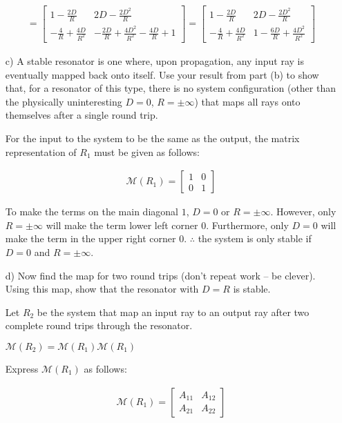 \documentclass[fleqn]{article}
\begin{document}
\begin{enumerate}[nolistsep]
			\begin{align*}
				= \begin{bmatrix}1 - \frac{2D}{R} & 2D - \frac{2D^2}{R}\\ -\frac{4}{R} +\frac{4D}{R^2} & -\frac{2D}{R} + \frac{4D^2}{R^2} -\frac{4D}{R} + 1\end{bmatrix} = \begin{bmatrix}1 - \frac{2D}{R} & 2D - \frac{2D^2}{R}\\ -\frac{4}{R} + \frac{4D}{R^2} & 1 - \frac{6D}{R} + \frac{4D^2}{R^2}\end{bmatrix}
			\end{align*}
			
			\item[c)] A stable resonator is one where, upon propagation, any input ray is eventually mapped back onto itself. Use your result from part (b) to show that, for a resonator of this type, there is no system configuration (other than the physically uninteresting $D = 0$, $R = \pm \infty$) that maps all rays onto themselves after a single round trip.
			
			\pagebreak
			For the input to the system to be the same as the output, the matrix representation of $R_1$ must be given as follows:
			
			\begin{align*}
				\mathcal{M}(R_1) = \begin{bmatrix}1 & 0\\ 0 & 1\end{bmatrix}
			\end{align*}
			
			To make the terms on the main diagonal $1$, $D = 0$ or $R = \pm\infty$. However, only $R = \pm\infty$ will make the term lower left corner $0$. Furthermore, only $D = 0$ will make the term in the upper right corner $0$. $\therefore$ the system is only stable if $D=0$ and $R=\pm\infty$.			
			
			\item[d)] Now find the map for two round trips (don’t repeat work – be clever). Using this map, show that the resonator with $D = R$ is stable.
			
			Let $R_2$ be the system that map an input ray to an output ray after two complete round trips through the resonator.
			
			$\mathcal{M}(R_2) = \mathcal{M}(R_1)\mathcal{M}(R_1)$
			
			Express $\mathcal{M}(R_1)$ as follows:
			
			\begin{align*}
				\mathcal{M}(R_1) = \begin{bmatrix}A_{11} & A_{12}\\ A_{21} & A_{22}\end{bmatrix}
			\end{align*}
			

\end{enumerate}
\end{document}

